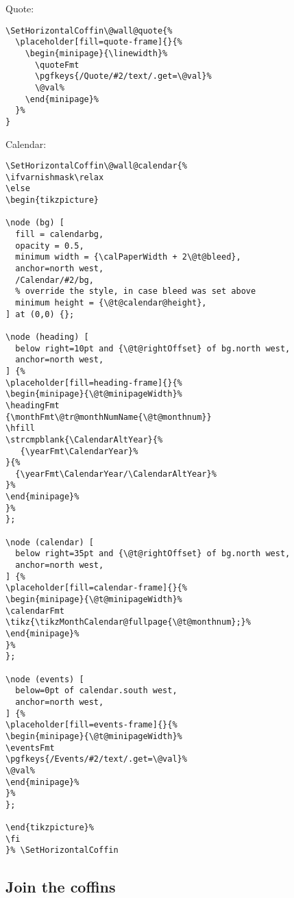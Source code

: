 \documentclass[11pt,oneside]{memoir-article}
\begin{document}
Quote:

\begin{verbatim}
\SetHorizontalCoffin\@wall@quote{%
  \placeholder[fill=quote-frame]{}{%
    \begin{minipage}{\linewidth}%
      \quoteFmt
      \pgfkeys{/Quote/#2/text/.get=\@val}%
      \@val%
    \end{minipage}%
  }%
}
\end{verbatim}

Calendar:

\begin{verbatim}
\SetHorizontalCoffin\@wall@calendar{%
\ifvarnishmask\relax
\else
\begin{tikzpicture}

\node (bg) [
  fill = calendarbg,
  opacity = 0.5,
  minimum width = {\calPaperWidth + 2\@t@bleed},
  anchor=north west,
  /Calendar/#2/bg,
  % override the style, in case bleed was set above
  minimum height = {\@t@calendar@height},
] at (0,0) {};

\node (heading) [
  below right=10pt and {\@t@rightOffset} of bg.north west,
  anchor=north west,
] {%
\placeholder[fill=heading-frame]{}{%
\begin{minipage}{\@t@minipageWidth}%
\headingFmt
{\monthFmt\@tr@monthNumName{\@t@monthnum}}
\hfill
\strcmpblank{\CalendarAltYear}{%
   {\yearFmt\CalendarYear}%
}{%
  {\yearFmt\CalendarYear/\CalendarAltYear}%
}%
\end{minipage}%
}%
};

\node (calendar) [
  below right=35pt and {\@t@rightOffset} of bg.north west,
  anchor=north west,
] {%
\placeholder[fill=calendar-frame]{}{%
\begin{minipage}{\@t@minipageWidth}%
\calendarFmt
\tikz{\tikzMonthCalendar@fullpage{\@t@monthnum};}%
\end{minipage}%
}%
};

\node (events) [
  below=0pt of calendar.south west,
  anchor=north west,
] {%
\placeholder[fill=events-frame]{}{%
\begin{minipage}{\@t@minipageWidth}%
\eventsFmt
\pgfkeys{/Events/#2/text/.get=\@val}%
\@val%
\end{minipage}%
}%
};

\end{tikzpicture}%
\fi
}% \SetHorizontalCoffin
\end{verbatim}

\subsection{Join the coffins}
\label{sec:org5055715}
\end{document}
